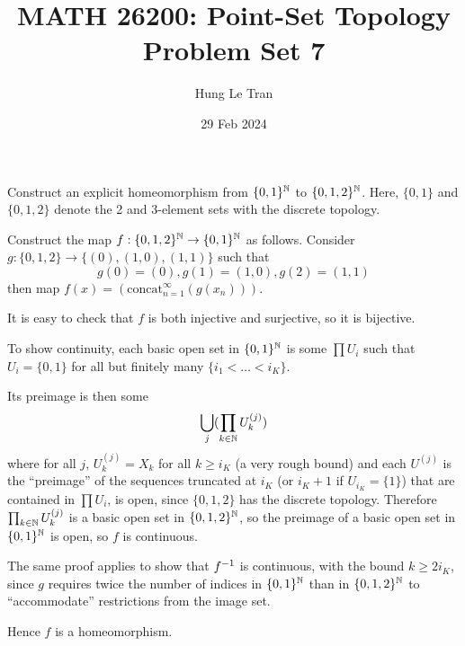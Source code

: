 \documentclass[a4paper, 10pt]{article}
\title{MATH 26200: Point-Set Topology \\ \large Problem Set 7}
\date{29 Feb 2024}
\author{Hung Le Tran}
\begin{document}
\maketitle
\setcounter{section}{7}
\begin{problem} [\done]
    Construct an explicit homeomorphism from $\{0, 1\}^{\mathbb{N}}$ to $\{0, 1, 2\}^{\mathbb{N}}$. Here, $\{0, 1\}$ and $\{0, 1, 2\}$ denote the 2 and 3-element sets with the discrete topology.
\end{problem}
\begin{solution} 
    Construct the map $f: \{0, 1, 2\}^{\mathbb{N}} \to \{0, 1\}^{\mathbb{N}}$ as follows. Consider $g: \{0, 1, 2\} \to \{(0), (1, 0), (1, 1)\}$ such that
    \begin{equation*}
    g(0) = (0), g(1) = (1, 0), g(2) = (1, 1)
    \end{equation*}
    then map $f(x) = (\text{concat}_{n = 1}^{\infty} (g(x_n)))$.

    It is easy to check that $f$ is both injective and surjective, so it is bijective.

    To show continuity, each basic open set in $\{0, 1\}^{\mathbb{N}}$ is some $\prod U_i$ such that $U_i = \{0, 1\}$ for all but finitely many $\{i_1 < \ldots < i_K\}$. 

    Its preimage is then some 
    \begin{equation*}
        \bigcup_j (\prod_{k \in \mathbb{N}} U^{(j)}_k)
    \end{equation*}
    where for all $j$, $U^{(j)}_k = X_k$ for all $k \geq i_K$ (a very rough bound) and each $U^{(j)}$ is the ``preimage'' of the sequences truncated at $i_K$ (or $i_K + 1$ if $U_{i_K} = \{1\}$) that are contained in $\prod U_i$, is open, since $\{0, 1, 2\}$ has the discrete topology. Therefore $\prod_{k \in \mathbb{N}} U^{(j)}_k$ is a basic open set in $\{0, 1, 2\}^{\mathbb{N}}$, so the preimage of a basic open set in $\{0, 1\}^{\mathbb{N}}$ is open, so $f$ is continuous.

    The same proof applies to show that ${f}^{-1}$ is continuous, with the bound $k \geq 2 i_K$, since $g$ requires twice the number of indices in $\{0, 1\}^{\mathbb{N}}$ than in $\{0, 1, 2\}^{\mathbb{N}}$ to ``accommodate'' restrictions from the image set.

    Hence $f$ is a homeomorphism.
\end{solution}
\end{document}
